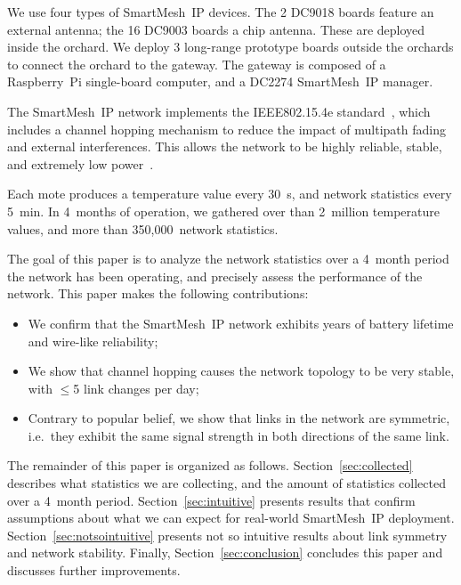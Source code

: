 \documentclass{sig-alternate}
\newcommand{\smip}                     {SmartMesh~IP\xspace}
\begin{document}

We use four types of \smip devices.
The 2 DC9018 boards feature an external antenna; the 16 DC9003 boards a chip antenna.
These are deployed inside the orchard.
We deploy 3 long-range prototype boards outside the orchards to connect the orchard to the gateway.
The gateway is composed of a Raspberry~Pi single-board computer, and a DC2274 \smip manager.


The \smip network implements the IEEE802.15.4e standard~\cite{std_ieee802154e_2012}, which includes a channel hopping mechanism to reduce the impact of multipath fading and external interferences.
This allows the network to be highly reliable, stable, and extremely low power~\cite{watteyne10mitigating, watteyne09reliability}.


Each mote produces a temperature value every 30~s, and network statistics every 5~min.
In 4~months of operation, we gathered over than 2~million temperature values, and more than 350,000~network statistics.


The goal of this paper is to analyze the network statistics over a 4~month period the network has been operating, and precisely assess the performance of the network.
This paper makes the following contributions:
\begin{itemize}
    \item We confirm that the \smip network exhibits years of battery lifetime and wire-like reliability;
    \item We show that channel hopping causes the network topology to be very stable, with $\leq$5 link changes per day;
    \item Contrary to popular belief, we show that links in the network are symmetric, i.e.~they exhibit the same signal strength in both directions of the same link.
\end{itemize}


The remainder of this paper is organized as follows.
Section~\ref{sec:collected} describes what statistics we are collecting, and the amount of statistics collected over a 4~month period.
Section~\ref{sec:intuitive} presents results that confirm assumptions about what we can expect for real-world \smip deployment.
Section~\ref{sec:notsointuitive} presents not so intuitive results about link symmetry and network stability.
Finally, Section~\ref{sec:conclusion} concludes this paper and discusses further improvements.
\end{document}

